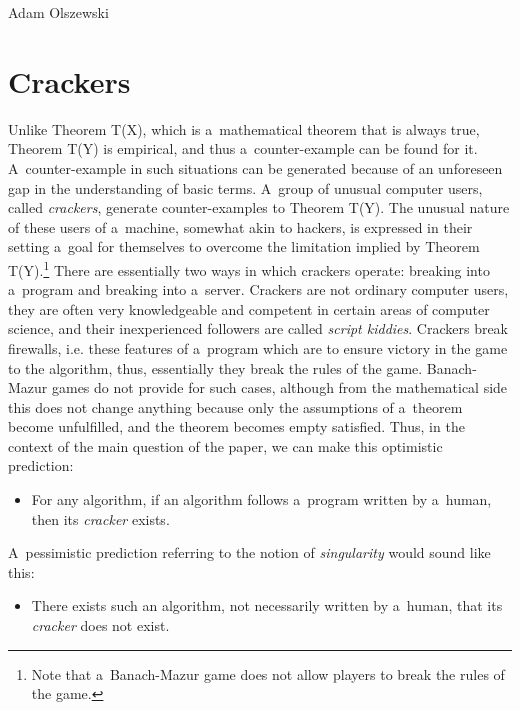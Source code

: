 \begin{artengenv}{Adam Olszewski}
\section{Crackers}
Unlike Theorem T(X), which is a~mathematical theorem that is always true, Theorem T(Y) is empirical, and thus a~counter-example can be found for it. A~counter-example in such situations can be generated because of an unforeseen gap in the understanding of basic terms. A~group of unusual computer users, called \textit{crackers}, generate counter-examples to Theorem T(Y). The unusual nature of these users of a~machine, somewhat akin to hackers, is expressed in their setting a~goal for themselves to overcome the limitation implied by Theorem T(Y).\footnote{Note that a~Banach-Mazur game does not allow players to break the rules of the game.} There are essentially two ways in which crackers operate: breaking into a~program and breaking into a~server. Crackers are not ordinary computer users, they are often very knowledgeable and competent in certain areas of computer science, and their inexperienced followers are called \textit{script kiddies}. Crackers break firewalls, i.e. these features of a~program which are to ensure victory in the game to the algorithm, thus, essentially they break the rules of the game. Banach-Mazur games do not provide for such cases, although from the mathematical side this does not change anything because only the assumptions of a~theorem become unfulfilled, and the theorem becomes empty satisfied. Thus, in the context of the main question of the paper, we can make this optimistic prediction:
\begin{itemize}
\item For any algorithm, if an algorithm follows a~program written by a~human, then its \textit{cracker} exists.
\end{itemize}
A~pessimistic prediction referring to the notion of \textit{singularity} would sound like this:
\begin{itemize}
\item There exists such an algorithm, not necessarily written by a~human, that its \textit{cracker} does not exist.
\end{itemize}


\end{artengenv}

